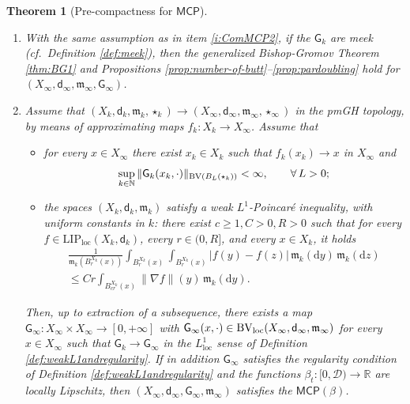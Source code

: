 \documentclass[11pt,a4paper]{article}
\theoremstyle{plain}
\newtheorem{theorem}{Theorem}[section]
\theoremstyle{definition}
\theoremstyle{remark}
\numberwithin{equation}{section}
\newcommand{\R}{\mathbb{R}} %
\newcommand{\N}{\mathbb{N}} %
\newcommand{\MCP}{\mathsf{MCP}}
\newcommand{\cD}{\mathcal{D}}
\newcommand{\loc}{\mathrm{loc}}
\newcommand{\di}{\mathrm{d}}
\newcommand{\mm}{\mathfrak m}
\newcommand{\sfd}{\mathsf d}
\newcommand{\sfG}{\mathsf G}
\begin{document}
\begin{theorem}[Pre-compactness for $\MCP$]
\begin{enumerate}[label = (\roman*)]
Then, up to extraction of a subsequence, there exists a continuous map $\sfG_\infty:X_\infty\times X_\infty \to [0,+\infty)$, and $\varepsilon_k \downarrow 0$, such that
\begin{equation}
|\sfG_k(x,y) - \sfG_\infty(f_k(x),f_k(y))|\leq \varepsilon_k, \qquad \forall\, x,y\in B_{L}(\star_k).
\end{equation}
In particular the conditions of Definition \ref{def:weakL1andregularity} hold, and if the functions $\beta_t:[0,\cD)\to \R$ are locally Lipschitz, then $(X_\infty,\sfd_\infty, \mm_\infty, \sfG_\infty)$ satisfies the $\MCP(\beta)$.
\item  \label{i:ComMCP3} With the same assumption as in item \ref{i:ComMCP2}, if the $\sfG_k$ are meek (cf.\ Definition \ref{def:meek}), then the generalized Bishop-Gromov Theorem \ref{thm:BG1} and Propositions \ref{prop:number-of-butt}--\ref{prop:pardoubling} hold for $(X_\infty,\sfd_\infty,\mm_{\infty}, \sfG_\infty)$.
\item  \label{i:ComMCP4} Assume that $(X_k,\sfd_k,\mm_k,\star_k)\to (X_\infty,\sfd_\infty,\mm_\infty,\star_\infty)$ in the pmGH topology, by means of approximating maps $f_k:X_k \to X_\infty$.  Assume that
\begin{itemize}
\item for every $x\in X_\infty$ there exist $x_{k}\in X_{k}$ such that $f_k(x_k) \to x$  in $X_\infty$ and
\begin{equation}\label{eq:BVlocUnif}
\sup_{k\in \N} \| \sfG_k (x_{k}, \cdot) \|_{{\rm BV}(B_{L} (\star_{k}))} <\infty, \qquad \forall\, L>0;
\end{equation}
\item the spaces $(X_k,\sfd_k,\mm_k)$ satisfy a weak $L^1$-Poincar\'e inequality, with uniform constants in $k$: there exist $c\geq 1, C>0, R>0$ such that for every $f\in \mathrm{LIP}_{\loc}(X_k,\sfd_k)$, every $r\in (0,R]$, and every $x\in X_k$, it holds
\begin{multline}\label{eq:L1weakpoinc}
\frac{1}{\mm_{k}(B^{X_{k}}_r(x))} \int_{B^{X_{k}}_r(x)}  \int_{B^{X_{k}}_r(x)} |f(y)-f(z)| \, \mm_{k}(\di y) \, \mm_{k}(\di z) \\
 \leq C r   \int_{B^{X_{k}}_{cr}(x)} \|\nabla f \|(y) \, \mm_{k}(\di y).
\end{multline}
\end{itemize}
Then, up to extraction of a subsequence, there exists a  map $\sfG_\infty:X_{\infty}\times X_{\infty} \to [0,+\infty]$ with $\sfG_\infty(x, \cdot)\in {\rm BV_{loc}}(X_{\infty}, \sfd_\infty,\mm_\infty)$ for every $x\in X_{\infty}$ such that  $\sfG_k\to \sfG_\infty$ in the $L^1_\loc$ sense of Definition \ref{def:weakL1andregularity}. If in addition $\sfG_\infty$ satisfies the regularity condition of Definition \ref{def:weakL1andregularity} and the functions $\beta_t:[0,\cD)\to \R$ are locally Lipschitz, then $(X_\infty,\sfd_\infty,\sfG_\infty,\mm_\infty)$ satisfies the $\MCP(\beta)$.
\end{enumerate}
\end{theorem}
\end{document}

